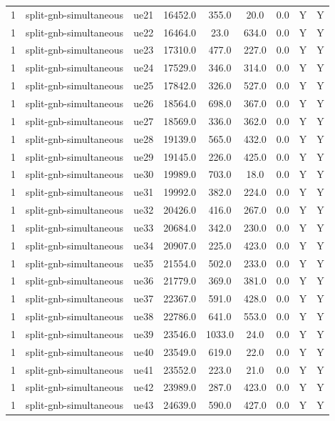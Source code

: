 \begin{table}[ht]
\begin{tabular}{|c|c|c|c|c|c|c|c|c|}
1 & split-gnb-simultaneous & ue21 & 16452.0 & 355.0 & 20.0 & 0.0 & Y & Y \\
1 & split-gnb-simultaneous & ue22 & 16464.0 & 23.0 & 634.0 & 0.0 & Y & Y \\
1 & split-gnb-simultaneous & ue23 & 17310.0 & 477.0 & 227.0 & 0.0 & Y & Y \\
1 & split-gnb-simultaneous & ue24 & 17529.0 & 346.0 & 314.0 & 0.0 & Y & Y \\
1 & split-gnb-simultaneous & ue25 & 17842.0 & 326.0 & 527.0 & 0.0 & Y & Y \\
1 & split-gnb-simultaneous & ue26 & 18564.0 & 698.0 & 367.0 & 0.0 & Y & Y \\
1 & split-gnb-simultaneous & ue27 & 18569.0 & 336.0 & 362.0 & 0.0 & Y & Y \\
1 & split-gnb-simultaneous & ue28 & 19139.0 & 565.0 & 432.0 & 0.0 & Y & Y \\
1 & split-gnb-simultaneous & ue29 & 19145.0 & 226.0 & 425.0 & 0.0 & Y & Y \\
1 & split-gnb-simultaneous & ue30 & 19989.0 & 703.0 & 18.0 & 0.0 & Y & Y \\
1 & split-gnb-simultaneous & ue31 & 19992.0 & 382.0 & 224.0 & 0.0 & Y & Y \\
1 & split-gnb-simultaneous & ue32 & 20426.0 & 416.0 & 267.0 & 0.0 & Y & Y \\
1 & split-gnb-simultaneous & ue33 & 20684.0 & 342.0 & 230.0 & 0.0 & Y & Y \\
1 & split-gnb-simultaneous & ue34 & 20907.0 & 225.0 & 423.0 & 0.0 & Y & Y \\
1 & split-gnb-simultaneous & ue35 & 21554.0 & 502.0 & 233.0 & 0.0 & Y & Y \\
1 & split-gnb-simultaneous & ue36 & 21779.0 & 369.0 & 381.0 & 0.0 & Y & Y \\
1 & split-gnb-simultaneous & ue37 & 22367.0 & 591.0 & 428.0 & 0.0 & Y & Y \\
1 & split-gnb-simultaneous & ue38 & 22786.0 & 641.0 & 553.0 & 0.0 & Y & Y \\
1 & split-gnb-simultaneous & ue39 & 23546.0 & 1033.0 & 24.0 & 0.0 & Y & Y \\
1 & split-gnb-simultaneous & ue40 & 23549.0 & 619.0 & 22.0 & 0.0 & Y & Y \\
1 & split-gnb-simultaneous & ue41 & 23552.0 & 223.0 & 21.0 & 0.0 & Y & Y \\
1 & split-gnb-simultaneous & ue42 & 23989.0 & 287.0 & 423.0 & 0.0 & Y & Y \\
1 & split-gnb-simultaneous & ue43 & 24639.0 & 590.0 & 427.0 & 0.0 & Y & Y \\

\end{tabular}
\end{table}
